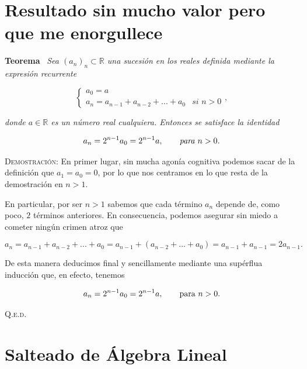 \documentclass{article}
\begin{document}
\newpage

\section{Resultado sin mucho valor pero que me enorgullece}

\textbf{Teorema} \, \textit{Sea $(a_n)_n \subset \mathbb{R}$ una sucesión en los reales definida mediante la expresión recurrente}

\[
\begin{cases}
    a_0 = a \\
    a_n = a_{n - 1} + a_{n - 2} + ... + a_0 & \textit{si $n > 0$}
\end{cases},
\]

\noindent \textit{donde $a \in \mathbb{R}$ es un número real cualquiera. Entonces se satisface la identidad}

\[a_n = 2^{n - 1}a_0 = 2^{n - 1}a, \hspace{20px} \textit{para $n > 0$.}\]

\vspace{10px}

\noindent \textsc{Demostración}: En primer lugar, sin mucha agonía cognitiva podemos sacar de la definición que $a_1 = a_0 = 0$, por lo que nos centramos en lo que resta de la demostración en $n > 1$.

En particular, por ser $n > 1$ sabemos que cada término $a_n$ depende de, como poco, $2$ términos anteriores. En consecuencia, podemos asegurar sin miedo a cometer ningún crimen atroz que

\[a_n = a_{n - 1} + a_{n - 2} + ... + a_0 = a_{n - 1} + (a_{n - 2} + ... + a_0) = a_{n - 1} + a_{n - 1} = 2a_{n - 1}.\]

\noindent De esta manera deducimos final y sencillamente mediante una supérflua inducción que, en efecto, tenemos

\[a_n = 2^{n - 1}a_0 = 2^{n - 1}a, \hspace{20px} \text{para $n > 0$.}\]

\hfill{\textsc{Q.e.d.}}

\newpage

\section{Salteado de Álgebra Lineal}
\end{document}
